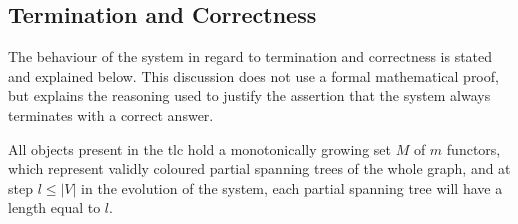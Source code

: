 \subsection{Termination and Correctness}
The behaviour of the system in regard to termination and correctness is stated and explained below.  This discussion does not use a formal mathematical proof, but explains the reasoning used to justify the assertion that the system always terminates with a correct answer.

\begin{proposition}\label{prop:gcol:grow}
All \bo{} objects present in the \gls{tlc} hold a monotonically growing set \(M\) of \(m\) functors, which represent validly coloured partial spanning trees of the whole graph, and at step \(l \leq |V|\) in the evolution of the system, each partial spanning tree will have a length equal to \(l\).
\end{proposition}


